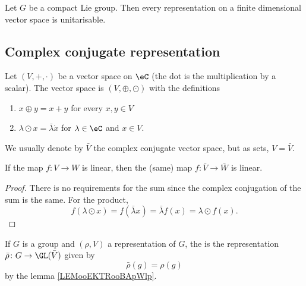 \begin{proposition}     \label{PROPooCFRGooZBBype}
    Let $G$ be a compact Lie group. Then every representation on a finite dimensional vector space is unitarisable.
\end{proposition}

\subsection{Complex conjugate representation}

\begin{definition}
    Let \( (V,+,\cdot)\) be a vector space on \( \eC\) (the dot is the multiplication by a scalar). The  vector space is \( (V,\oplus,\odot)\) with the definitions
    \begin{enumerate}
        \item
            \( x\oplus y=x+y\) for every \( x,y\in V\)
        \item
            \( \lambda\odot x=\bar \lambda\dot x\) for \( \lambda\in \eC\) and \( x\in V\).
    \end{enumerate}
    We usually denote by \( \bar V\) the complex conjugate vector space, but as sets, \( V=\bar V\).
\end{definition}

\begin{lemma}       \label{LEMooEKTRooBApWlp}
    If the map \( f\colon V\to W\) is linear, then the (same) map \( f\colon \bar V\to \bar W\) is linear.
\end{lemma}

\begin{proof}
    There is no requirements for the sum since the complex conjugation of the sum is the same. For the product,
    \begin{equation}
        f(\lambda\odot x)=f(\bar \lambda x)=\bar \lambda f(x)=\lambda\odot f(x).
    \end{equation}
\end{proof}

\begin{definition}
    If \( G\) is a group and \( (\rho, V)\) a representation of \( G\), the  is the representation \( \bar \rho\colon G\to \GL(\bar V)\) given by
    \begin{equation}
        \bar\rho(g)=\rho(g)
    \end{equation}
    by the lemma \ref{LEMooEKTRooBApWlp}.
\end{definition}

